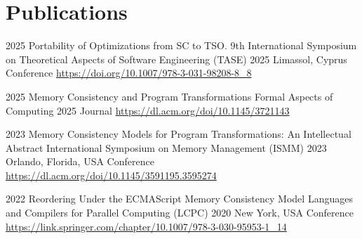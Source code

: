 
\section{Publications}

\cventry
{2025}
{Portability of Optimizations from SC to TSO.}
{9th International Symposium on Theoretical Aspects of Software Engineering (TASE) 2025}
{Limassol, Cyprus}
{Conference}
{\url{https://doi.org/10.1007/978-3-031-98208-8_8}}

\cventry
{2025}
{Memory Consistency and Program Transformations}
{Formal Aspects of Computing 2025}
{}
{Journal}
{\url{https://dl.acm.org/doi/10.1145/3721143}}

\cventry
{2023}
{Memory Consistency Models for Program Transformations: An Intellectual Abstract}
{International Symposium on Memory Management (ISMM) 2023}
{Orlando, Florida, USA}
{Conference}
{\url{https://dl.acm.org/doi/10.1145/3591195.3595274}}

\cventry
{2022}
{Reordering Under the ECMAScript Memory Consistency Model}
{Languages and Compilers for Parallel Computing (LCPC) 2020}
{New York, USA}
{Conference}
{\url{https://link.springer.com/chapter/10.1007/978-3-030-95953-1_14}}


